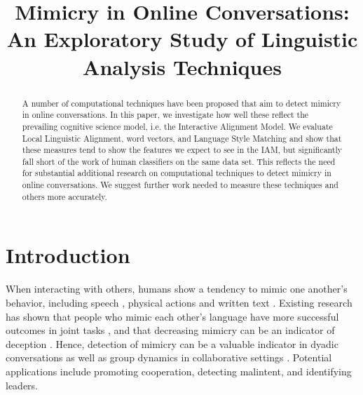 \documentclass[conference]{IEEEtran}
\begin{document}
\title{Mimicry in Online Conversations: An Exploratory Study of Linguistic Analysis Techniques}

\author{
}


\maketitle

\begin{abstract}
A number of computational techniques have been proposed that aim to detect mimicry in online conversations. In this paper, we investigate how well these reflect the prevailing cognitive science model, i.e. the Interactive Alignment Model. We evaluate Local Linguistic Alignment, word vectors, and Language Style Matching and show that these measures tend to show the features we expect to see in the IAM, but significantly fall short of the work of human classifiers on the same data set. This reflects the need for substantial additional research on computational techniques to detect mimicry in online conversations. We suggest further work needed to measure these techniques and others more accurately.

\end{abstract}


\IEEEpeerreviewmaketitle


\section{Introduction}

When interacting with others, humans show a tendency to mimic one another's behavior, including speech \cite{levelt1982surface, bock1986syntactic, bock1989closed, garrod1987saying}, physical actions \cite{bernieri1988coordinated} and written text \cite{danescu2011chameleons, scissors2008linguistic}. Existing research has shown that people who mimic each other's language have more successful outcomes in joint tasks \cite{richardson2014language}, and that decreasing mimicry can be an indicator of deception \cite{taylor2013detecting}. Hence, detection of mimicry can be a valuable indicator in dyadic conversations as well as group dynamics in collaborative settings \cite{scissors2009cmc}. Potential applications include promoting cooperation, detecting malintent, and identifying leaders.
\end{document}
